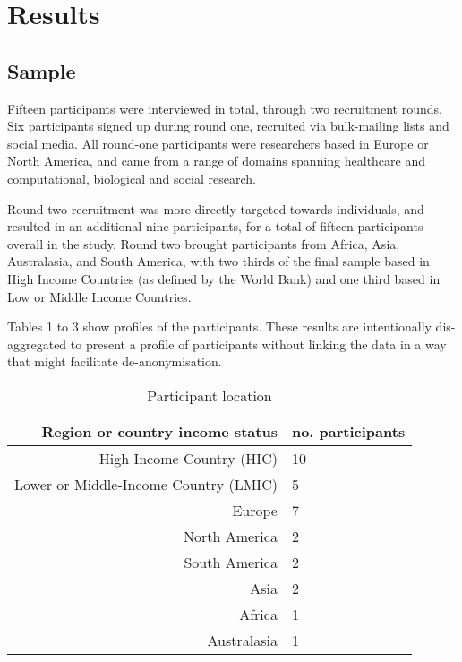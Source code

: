 \documentclass{CUP-JNL-DAP}%
\begin{document}
\section{Results}
\subsection{Sample}
Fifteen participants were interviewed in total, through two recruitment rounds. Six participants signed up during round one, recruited via bulk-mailing lists and social media. All round-one participants were researchers based in Europe or North America, and came from a range of domains spanning healthcare and computational, biological and social research.

Round two recruitment was more directly targeted towards individuals, and resulted in an additional nine participants, for a total of fifteen participants overall in the study. Round two brought participants from Africa, Asia, Australasia, and South America, with two thirds of the final sample based in High Income Countries (as defined by the World Bank) and one third based in Low or Middle Income Countries. 

Tables 1 to 3 show profiles of the participants. These results are intentionally dis-aggregated to present a profile of participants without linking the data in a way that might facilitate de-anonymisation.

\begin{table}[h!]
  \begin{center}
    \caption{Participant location}
    \label{tab:locations}
    \begin{tabular}{r|l} %
      \textbf{Region or country income status} & \textbf{no. participants} \\
      \hline
        High Income Country (HIC)&10\\
        Lower or Middle-Income Country (LMIC) &5 \\
        \hline
        Europe&7\\
        North America&2\\
        South America&2\\
        Asia&2\\
        Africa&1\\
        Australasia&1\\
    \end{tabular}
  \end{center}
\end{table}
\end{document}
